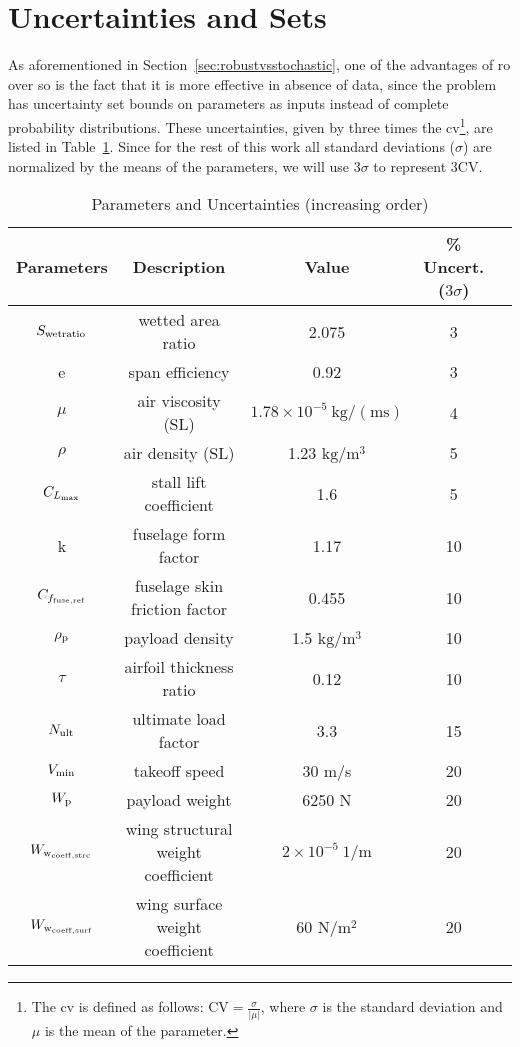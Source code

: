 \section{Uncertainties and Sets}
\label{uncertainties_and_sets}

As aforementioned in Section~\ref{sec:robustvsstochastic}, one of the advantages
of \gls{ro} over \gls{so} is the fact that it is more effective in absence of
data, since the problem has uncertainty set bounds on parameters as inputs instead
of complete probability distributions.
These uncertainties, given by three times the \gls{cv}\footnote{The \gls{cv}
is defined as follows: $\text{CV} = \frac{\sigma}{|\mu|}$, where $\sigma$ is the standard deviation and $\mu$ is the mean of the parameter.},
are listed in Table~\ref{tab:uncertainties}. Since for the rest of this work
all standard deviations ($\sigma$) are normalized by the means of the parameters, we will use $3\sigma$
to represent $3\text{CV}$.

\begin{table}
\begin{center}
\caption{\label{tab:uncertainties} Parameters and Uncertainties (increasing order)}
\begin{tabular}{c c c c c}
\hline
Parameters & Description & Value & \% Uncert. ($3\sigma$) \\
\hline
$S_{\rm{wetratio}}$ & wetted area ratio & 2.075 & 3\\
e & span efficiency & 0.92 & 3\\
$\mu$ & air viscosity (SL) & $1.78 \times 10^{-5}~\mathrm{kg/(ms)}$ & 4 \\
$\rho$ & air density (SL) & 1.23 $\mathrm{kg/m^3}$ & 5 \\
$C_{L_{\rm{max}}}$ & stall lift coefficient & 1.6 & 5\\
k & fuselage form factor & 1.17 & 10\\
$C_{f_{\rm{fuse, ref}}}$ & fuselage skin friction factor & 0.455 & 10 \\
$\rho_{\rm{p}}$ & payload density & 1.5 $\mathrm{kg/m^3}$ & 10 \\
$\tau$ & airfoil thickness ratio & 0.12 & 10\\
$N_{\rm{ult}}$ & ultimate load factor & 3.3 & 15\\
$V_{\rm{min}}$ & takeoff speed & 30 m/s & 20\\
$W_{\rm{p}}$ & payload weight & 6250 N & 20\\
$W_{\rm{w}_{\rm{coeff,strc}}}$ & wing structural weight coefficient & $2 \times 10^{-5}~1/\mathrm{m}$ & 20\\
$W_{\rm{w}_{\rm{coeff,surf}}}$ & wing surface weight coefficient & 60 $\mathrm{N/m^2}$ & 20\\
\hline
\end{tabular}
\end{center}
\end{table}

